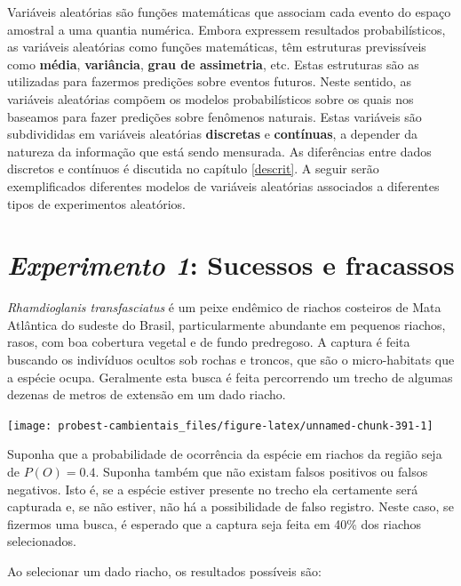 \documentclass[
]{book}
\begin{document}
Variáveis aleatórias são funções matemáticas que associam cada evento do espaço amostral a uma quantia numérica. Embora expressem resultados probabilísticos, as variáveis aleatórias como funções matemáticas, têm estruturas previssíveis como \textbf{média}, \textbf{variância}, \textbf{grau de assimetria}, etc. Estas estruturas são as utilizadas para fazermos predições sobre eventos futuros. Neste sentido, as variáveis aleatórias compõem os modelos probabilísticos sobre os quais nos baseamos para fazer predições sobre fenômenos naturais. Estas variáveis são subdivididas em variáveis aleatórias \textbf{discretas} e \textbf{contínuas}, a depender da natureza da informação que está sendo mensurada. As diferências entre dados discretos e contínuos é discutida no capítulo \ref{descrit}. A seguir serão exemplificados diferentes modelos de variáveis aleatórias associados a diferentes tipos de experimentos aleatórios.

\hypertarget{experimento-1-sucessos-e-fracassos}{%
\section{\texorpdfstring{\emph{Experimento 1}: Sucessos e fracassos}{Experimento 1: Sucessos e fracassos}}\label{experimento-1-sucessos-e-fracassos}}

\emph{Rhamdioglanis transfasciatus} é um peixe endêmico de riachos costeiros de Mata Atlântica do sudeste do Brasil, particularmente abundante em pequenos riachos, rasos, com boa cobertura vegetal e de fundo predregoso. A captura é feita buscando os indivíduos ocultos sob rochas e troncos, que são o micro-habitats que a espécie ocupa. Geralmente esta busca é feita percorrendo um trecho de algumas dezenas de metros de extensão em um dado riacho.

\begin{center}\texttt{[image: probest-cambientais\_files/figure-latex/unnamed-chunk-391-1]} \end{center}

Suponha que a probabilidade de ocorrência da espécie em riachos da região seja de \(P(O) = 0.4\). Suponha também que não existam falsos positivos ou falsos negativos. Isto é, se a espécie estiver presente no trecho ela certamente será capturada e, se não estiver, não há a possibilidade de falso registro. Neste caso, se fizermos uma busca, é esperado que a captura seja feita em 40\% dos riachos selecionados.

Ao selecionar um dado riacho, os resultados possíveis são:
\end{document}
